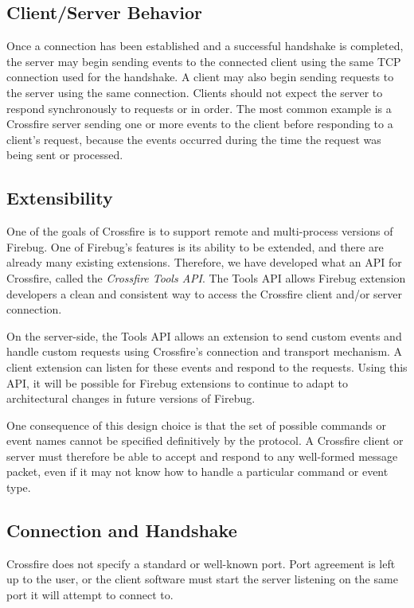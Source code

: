\subsection {Client/Server Behavior}
Once a connection has been established and a successful handshake is completed,
the server may begin sending events to the connected client using the same TCP
connection used for the handshake. A client may also begin sending requests to
the server using the same connection. Clients should not expect the server to
respond synchronously to requests or in order. The most common example is a
Crossfire server sending one or more events to the client before responding to a
client's request, because the events occurred during the time the request was
being sent or processed.

\subsection {Extensibility}
One of the goals of Crossfire is to support remote and multi-process versions of
Firebug. One of Firebug's features is its ability to be extended, and there are
already many existing extensions. Therefore, we have developed what an API for
Crossfire, called the \textit{Crossfire Tools API}. The Tools API allows Firebug
extension developers a clean and consistent way to access the Crossfire client
and/or server connection.

On the server-side, the Tools API allows an extension to send custom events
and handle custom requests using Crossfire's connection and transport mechanism.
A client extension can listen for these events and respond to the requests.
Using this API, it will be possible for Firebug extensions to continue to adapt
to architectural changes in future versions of Firebug.

One consequence of this design choice is that the set of possible commands or
event names cannot be specified definitively by the protocol. A Crossfire
client or server must therefore be able to accept and respond to any well-formed
message packet, even if it may not know how to handle a particular command or
event type.

\subsection {Connection and Handshake}
Crossfire does not specify a standard or well-known port. Port agreement is left
up to the user, or the client software must start the server listening on
the same port it will attempt to connect to.

